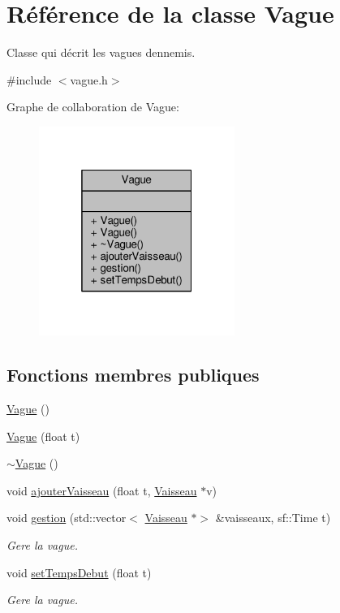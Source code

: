 \hypertarget{class_vague}{}\section{Référence de la classe Vague}
\label{class_vague}


Classe qui décrit les vagues d\textquotesingle{}ennemis.  




{\ttfamily \#include $<$vague.\+h$>$}



Graphe de collaboration de Vague\+:\nopagebreak
\begin{figure}[H]
\begin{center}
\leavevmode
\includegraphics[width=181pt]{class_vague__coll__graph}
\end{center}
\end{figure}
\subsection*{Fonctions membres publiques}
\begin{DoxyCompactItemize}
\item 
\hyperlink{class_vague_ab1e4786aa02ad641431b56658dbbaac3}{Vague} ()
\item 
\hyperlink{class_vague_a5a77009c7b36f68c5c5090c72294faa4}{Vague} (float t)
\item 
\hyperlink{class_vague_a72eb74bd6b6cc6de266fa4b8f77e56d4}{$\sim$\+Vague} ()
\item 
void \hyperlink{class_vague_a82124cdeb165825047f9dd8164e69a16}{ajouter\+Vaisseau} (float t, \hyperlink{class_vaisseau}{Vaisseau} $\ast$v)
\item 
void \hyperlink{class_vague_a37649d5f8063b1d516ce1f865a9d521d}{gestion} (std\+::vector$<$ \hyperlink{class_vaisseau}{Vaisseau} $\ast$$>$ \&vaisseaux, sf\+::\+Time t)
\begin{DoxyCompactList}\small\item\em Gere la vague. \end{DoxyCompactList}\item 
void \hyperlink{class_vague_a564d612f69751dd198ffa7ac61ea04dd}{set\+Temps\+Debut} (float t)
\begin{DoxyCompactList}\small\item\em Gere la vague. \end{DoxyCompactList}\end{DoxyCompactItemize}


